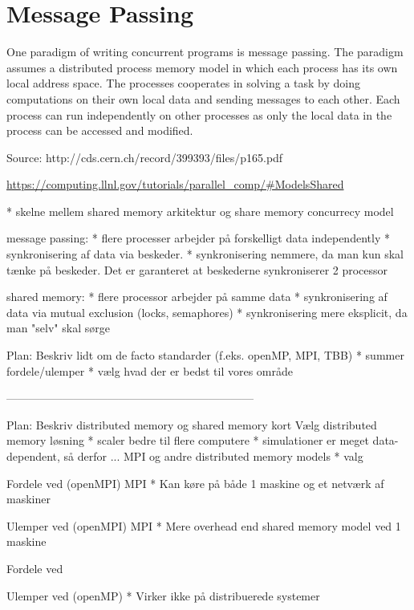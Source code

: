 \section{Message Passing}

One paradigm of writing concurrent programs is message passing. The paradigm assumes a distributed process memory model in which each process has its own local address space. The processes cooperates in solving a task by doing computations on their own local data and sending messages to each other. Each process can run independently on other processes as only the local data in the process can be accessed and modified.

Source: http://cds.cern.ch/record/399393/files/p165.pdf

\url{https://computing.llnl.gov/tutorials/parallel_comp/#ModelsShared}

* skelne mellem shared memory arkitektur og share memory concurrecy model


message passing:
* flere processer arbejder på forskelligt data independently
* synkronisering af data via beskeder.
* synkronisering nemmere, da man kun skal tænke på beskeder. Det er garanteret at beskederne synkroniserer 2 processor

shared memory:
* flere processor arbejder på samme data
* synkronisering af data via mutual exclusion (locks, semaphores)
* synkronisering mere eksplicit, da man "selv" skal sørge

Plan:
Beskriv lidt om de facto standarder (f.eks. openMP, MPI, TBB)
* summer fordele/ulemper
* vælg hvad der er bedst til vores område

------------------------------------------------------------------

Plan:
Beskriv distributed memory og shared memory kort
Vælg distributed memory løsning
* scaler bedre til flere computere
* simulationer er meget data-dependent, så derfor ...
MPI og andre distributed memory models
* valg



Fordele ved (openMPI) MPI
* Kan køre på både 1 maskine og et netværk af maskiner

Ulemper ved (openMPI) MPI
* Mere overhead end shared memory model ved 1 maskine

Fordele ved

Ulemper ved (openMP)
* Virker ikke på distribuerede systemer
